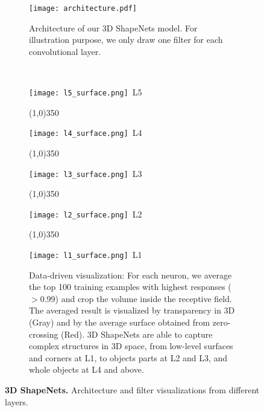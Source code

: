 \documentclass[10pt,twocolumn,letterpaper]{article}
\begin{document}
\begin{figure*}
   \centering
	\begin{subfigure}{0.27\textwidth}
			\centering
             \texttt{[image: architecture.pdf]}
              \caption{Architecture of our 3D ShapeNets model. For illustration purpose, we only draw one filter for each convolutional layer.}
              \label{fig:architecture}
     \end{subfigure}
     ~
	 \begin{subfigure}{0.71\textwidth}
		\centering




		\texttt{[image: l5\_surface.png]}~L5
		
		\vspace{-3mm}\line(1,0){350}
		
		\texttt{[image: l4\_surface.png]}~L4
		
		\vspace{-3mm}\line(1,0){350}
		
		\texttt{[image: l3\_surface.png]}~L3
		
		\vspace{-3mm}\line(1,0){350}
		
		\texttt{[image: l2\_surface.png]}~L2
		
		\vspace{-3mm}\line(1,0){350}
	
	         \texttt{[image: l1\_surface.png]}~L1
             \caption{Data-driven visualization: For each neuron, we average the top 100 training examples with highest responses ($>$0.99) and crop the volume inside the receptive field. The averaged result is visualized by transparency in 3D (Gray) and by the average surface obtained from  zero-crossing (Red). 3D ShapeNets are able to capture complex structures in 3D space,
from low-level surfaces and corners at L1, to objects parts at L2 and L3, and whole objects at L4 and above.}
              \label{fig:filters}
     \end{subfigure}

\vspace{-1mm}
\caption{{\bf 3D ShapeNets.} Architecture and filter visualizations from different layers.}
\label{fig:ShapeNets}
\end{figure*}
\end{document}
